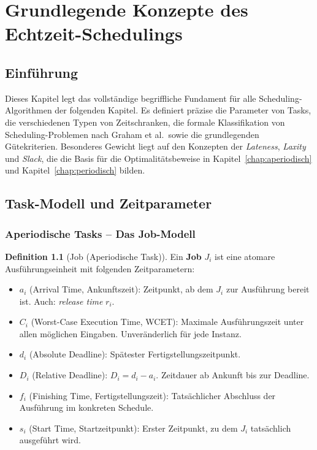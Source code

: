 ﻿\documentclass[a4paper,12pt]{report}
\theoremstyle{definition}
\newtheorem{definition}{Definition}[chapter]
\begin{document}
\chapter{Grundlegende Konzepte des Echtzeit-Schedulings}
\label{chap:basic}

\section{Einführung}

Dieses Kapitel legt das vollständige begriffliche Fundament für alle
Scheduling-Algorithmen der folgenden Kapitel. Es definiert präzise die
Parameter von Tasks, die verschiedenen Typen von Zeitschranken, die formale
Klassifikation von Scheduling-Problemen nach Graham et al.\ sowie die
grundlegenden Gütekriterien. Besonderes Gewicht liegt auf den Konzepten
der \emph{Lateness}, \emph{Laxity} und \emph{Slack}, die die Basis für
die Optimalitätsbeweise in Kapitel~\ref{chap:aperiodisch} und
Kapitel~\ref{chap:periodisch} bilden.

\section{Task-Modell und Zeitparameter}

\subsection{Aperiodische Tasks -- Das Job-Modell}

\begin{definition}[Job (Aperiodische Task)]
	Ein \textbf{Job} $J_i$ ist eine atomare Ausführungseinheit mit folgenden
	Zeitparametern:
	\begin{itemize}
		\item $a_i$ (Arrival Time, Ankunftszeit): Zeitpunkt, ab dem $J_i$ zur
		      Ausführung bereit ist. Auch: \emph{release time} $r_i$.
		\item $C_i$ (Worst-Case Execution Time, WCET): Maximale Ausführungszeit
		      unter allen möglichen Eingaben. Unveränderlich für jede Instanz.
		\item $d_i$ (Absolute Deadline): Spätester Fertigstellungszeitpunkt.
		\item $D_i$ (Relative Deadline): $D_i = d_i - a_i$. Zeitdauer ab
		      Ankunft bis zur Deadline.
		\item $f_i$ (Finishing Time, Fertigstellungszeit): Tatsächlicher
		      Abschluss der Ausführung im konkreten Schedule.
		\item $s_i$ (Start Time, Startzeitpunkt): Erster Zeitpunkt, zu dem
		      $J_i$ tatsächlich ausgeführt wird.
	\end{itemize}
\end{definition}
\end{document}
